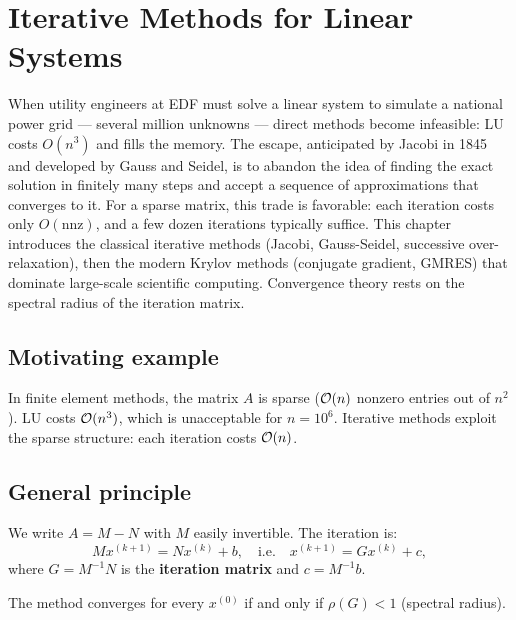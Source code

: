 \chapter{Iterative Methods for Linear Systems}
\label{ch:iterative}

When utility engineers at EDF must solve a linear system to simulate a national power grid --- several million unknowns --- direct methods become infeasible: LU costs $O(n^3)$ and fills the memory. The escape, anticipated by Jacobi in 1845 and developed by Gauss and Seidel, is to abandon the idea of finding the exact solution in finitely many steps and accept a sequence of approximations that converges to it. For a sparse matrix, this trade is favorable: each iteration costs only $O(\text{nnz})$, and a few dozen iterations typically suffice. This chapter introduces the classical iterative methods (Jacobi, Gauss-Seidel, successive over-relaxation), then the modern Krylov methods (conjugate gradient, GMRES) that dominate large-scale scientific computing. Convergence theory rests on the spectral radius of the iteration matrix.

\section{Motivating example}
In finite element methods, the matrix $A$ is sparse ($\mathcal{O}(n)$ nonzero entries out of $n^2$). LU costs $\mathcal{O}(n^3)$, which is unacceptable for $n=10^6$. Iterative methods exploit the sparse structure: each iteration costs $\mathcal{O}(n)$.

\section{General principle}

\begin{definition}
We write $A=M-N$ with $M$ easily invertible. The iteration is:
\[
Mx^{(k+1)} = Nx^{(k)}+b, \quad\text{i.e.}\quad x^{(k+1)}=Gx^{(k)}+c,
\]
where $G=M^{-1}N$ is the \textbf{iteration matrix} and $c=M^{-1}b$.
\end{definition}

\begin{theorem}[Convergence]\label{thm:iter-conv}
The method converges for every $x^{(0)}$ if and only if $\rho(G)<1$ (spectral radius).
\end{theorem}

